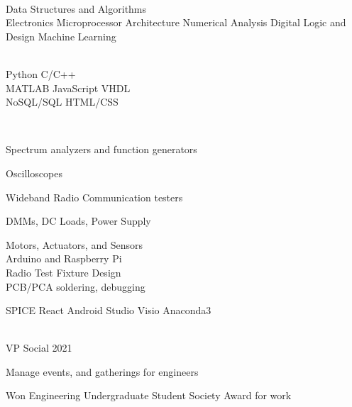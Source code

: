 \documentclass[]{deedy-resume-openfont}
\begin{document}
\begin{minipage}

\begin{multicols}{3}
\begin{multirows}

\location{}
 \\
\location{}
Data Structures and Algorithms \\
Electronics \newline
Microprocessor Architecture \newline
Numerical Analysis \newline
Digital Logic and Design \newline
Machine Learning 
\sectionsep

\\
\textbullet{}
Python \textbullet{}
C/C++ \\ \textbullet{} 
MATLAB \textbullet{}
JavaScript \textbullet{}
VHDL \\ \textbullet{} 
NoSQL/SQL \textbullet{} HTML/CSS

\sectionsep
\end{multirows}
\columnbreak

\location{}
\\
\begin{tightemize}
\item Spectrum analyzers and function generators
\item Oscilloscopes
\item Wideband Radio Communication testers
\item DMMs, DC Loads, Power Supply
\end{tightemize}
Motors, Actuators, and Sensors\\
Arduino and Raspberry Pi \\
Radio Test Fixture Design \\
PCB/PCA soldering, debugging
\sectionsep

\location{}
\location{}
\textbullet{} SPICE \textbullet{}
React \textbullet{} 
Android Studio \textbullet{}
Visio \textbullet{}
Anaconda3 
\sectionsep

\columnbreak
\location{}
\begin{multirows}
\location{}
\\
VP Social 2021
\begin{tightemize}
\item Manage events, and gatherings for engineers
\item Won Engineering Undergraduate Student Society Award for work 
\end{tightemize}


\end{multirows}
\end{multicols}
\end{minipage}
\end{document}
